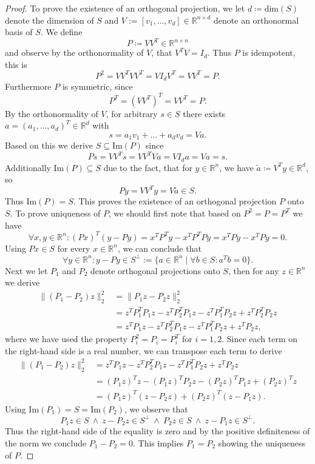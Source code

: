 \documentclass[11pt, a4paper]{article}
\newcommand{\R}{\mathds{R}}
\begin{document}
\begin{proof}
To prove the existence of an orthogonal projection, we let $d \coloneq \text{dim}(S)$ denote the dimension of $S$ and $V := [v_1, \dots, v_d] \in \R^{n \times d}$ denote an orthonormal basis of $S$. We define
\[ P \coloneq VV^T \in \R^{n \times n} \]
and observe by the orthonormality of $V$, that $V^TV = I_d$. Thus $P$ is idempotent, this is
\[ P^2 = VV^T VV^T = V I_d V^T = VV^T = P. \]
Furthermore $P$ is symmetric, since 
\[ P^T = (VV^T)^T = VV^T = P. \]
By the orthonormality of $V$, for arbitrary $s \in S$ there exists $a = (a_1, \dots, a_d)^T \in \R^d$ with
\[ s = a_1v_1 + \dots + a_dv_d = Va. \]
Based on this we derive $S \subseteq \text{Im}(P)$ since
\[ Ps = VV^Ts = VV^TVa = VI_da = Va =s. \]
Additionally $\text{Im}(P) \subseteq S$ due to the fact, that for $y \in \R^n$, we have $\tilde{a} \coloneq V^Ty \in \R^d$, so
\[ Py = VV^Ty = V\tilde{a} \in S. \]
Thus $\text{Im}(P) = S$. This proves the existence of an orthogonal projection $P$ onto $S$. To prove uniqueness of $P$, we should first note that based on $P^2 = P = P^T$ we have
\[ \forall x,y \in \R^n : (Px)^T(y-Py) = x^TP^Ty - x^TP^TPy = x^TPy - x^TPy = 0. \]
Using $Px \in S$ for every $x \in \R^n$, we can conclude that 
\[ \forall y \in \R^n : y - Py \in S^\perp := \big \{ a \in \R^n \mid \forall b \in S : a^Tb = 0 \big \}. \]
Next we let $P_1$ and $P_2$ denote orthogonal projections onto $S$, then for any $z \in \R^n$ we derive
\[ \begin{split}
\big \| (P_1-P_2)z \big \|_2^2 
&= \big \| P_1z -P_2z \big \|_2^2 \\\
&= z^TP_1^TP_1z - z^TP_2^TP_1z -  z^TP_1^TP_2z + z^TP_2^TP_2z \\\
&= z^TP_1z - z^TP_2^TP_1z -  z^TP_1^TP_2z + z^TP_2z,
\end{split} \]
where we have used the property $P_i^2 = P_i = P_i^T$ for $i=1,2$. Since each term on the right-hand side is a real number, we can transpose each term to derive
\[ \begin{split}
\big \| (P_1-P_2)z \big \|_2^2 
&=  z^TP_1z - z^TP_2^TP_1z -  z^TP_1^TP_2z + z^TP_2z \\\
&= (P_1z)^Tz - (P_1z)^TP_2z - (P_2z)^TP_1z + (P_2z)^Tz \\\
&= (P_1z)^T(z-P_2z) + (P_2z)^T(z-P_1z).
\end{split} \] 
Using $\text{Im}(P_1) = S = \text{Im}(P_2)$, we observe that 
\[ P_1z \in S \ \wedge \ z-P_2z \in S^\perp \ \wedge \ P_2z \in S \ \wedge \ z - P_1z \in S^\perp. \]
Thus the right-hand side of the equality is zero and by the positive definiteness of the norm we conclude $P_1 - P_2 = 0$. This implies $P_1 = P_2$ showing the uniqueness of $P$.
\end{proof}
\end{document}
